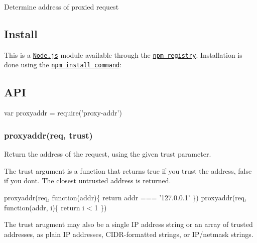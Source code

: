 \href{https://npmjs.org/package/proxy-addr}{\tt } \href{https://npmjs.org/package/proxy-addr}{\tt } \href{https://nodejs.org/en/download/}{\tt } \href{https://travis-ci.org/jshttp/proxy-addr}{\tt } \href{https://coveralls.io/r/jshttp/proxy-addr?branch=master}{\tt }

Determine address of proxied request

\subsection*{Install}

This is a \href{https://nodejs.org/en/}{\tt Node.\+js} module available through the \href{https://www.npmjs.com/}{\tt npm registry}. Installation is done using the \href{https://docs.npmjs.com/getting-started/installing-npm-packages-locally}{\tt {\ttfamily npm install} command}\+:




\subsection*{A\+PI}


\begin{DoxyCode}
var proxyaddr = require('proxy-addr')
\end{DoxyCode}


\subsubsection*{proxyaddr(req, trust)}

Return the address of the request, using the given {\ttfamily trust} parameter.

The {\ttfamily trust} argument is a function that returns {\ttfamily true} if you trust the address, {\ttfamily false} if you don\textquotesingle{}t. The closest untrusted address is returned.


\begin{DoxyCode}
proxyaddr(req, function(addr)\{ return addr === '127.0.0.1' \})
proxyaddr(req, function(addr, i)\{ return i < 1 \})
\end{DoxyCode}


The {\ttfamily trust} arugment may also be a single IP address string or an array of trusted addresses, as plain IP addresses, C\+I\+D\+R-\/formatted strings, or I\+P/netmask strings.


